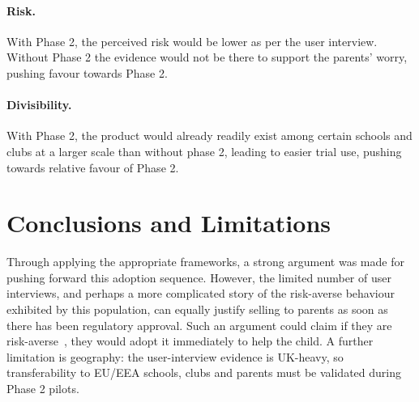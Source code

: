 \paragraph{Risk.} With Phase 2, the perceived risk would be lower as per the user interview. Without Phase 2 the evidence would not be there to support the parents' worry, pushing favour towards Phase 2.

\paragraph{Divisibility.} With Phase 2, the product would already readily exist among certain schools and clubs at a larger scale than without phase 2, leading to easier trial use, pushing towards relative favour of Phase 2.


\section{Conclusions and Limitations}
\label{sec:ent-roadmap-conclusions}

Through applying the appropriate frameworks, a strong argument was made for pushing forward this adoption sequence. However, the limited number of user interviews, and perhaps a more complicated story of the risk-averse behaviour exhibited by this population, can equally justify selling to parents as soon as there has been regulatory approval. Such an argument could claim if they are risk-averse~\cite{stone2013selfother,dore2014parental}, they would adopt it immediately to help the child. A further limitation is geography: the user-interview evidence is UK-heavy, so transferability to EU/EEA schools, clubs and parents must be validated during Phase 2 pilots.

